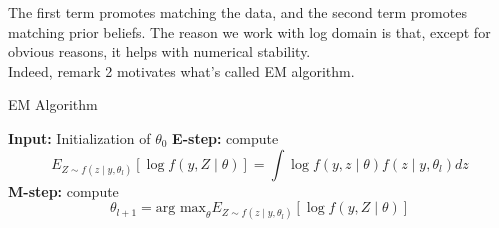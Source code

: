 \documentclass{article}
\theoremstyle{remark}
\begin{document}
The first term promotes matching the data, and the second term promotes matching prior beliefs.
The reason we work with log domain is that, except for obvious reasons, it helps with numerical stability.
\\
Indeed, remark 2 motivates what's called EM algorithm.
\begin{algorithm}
    \caption{EM Algorithm}
    \begin{algorithmic}
    \STATE \textbf{Input:} Initialization of $\theta_0$
    \REPEAT
        \STATE \textbf{E-step:} compute 
        \[
        E_{Z\sim f(z\mid y,\theta_l)}[\log f(y,Z\mid \theta)] = \int \log f(y,z\mid \theta)f(z\mid y,\theta_l)dz
        \]
        \STATE \textbf{M-step:} compute
        \[
        \theta_{l+1} = \text{arg max}_\theta E_{Z\sim f(z\mid y,\theta_l)}[\log f(y,Z\mid \theta)]
        \]
    \end{algorithmic}
    \end{algorithm}
\end{document}
